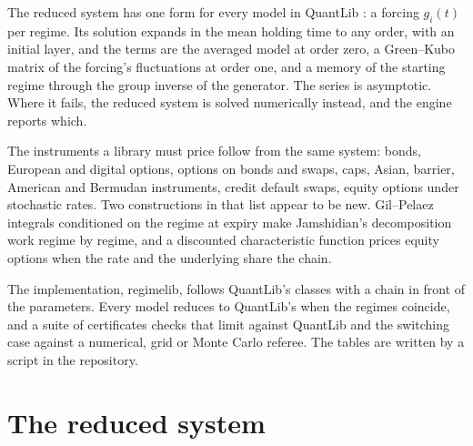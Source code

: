 \documentclass[11pt]{article}
\theoremstyle{remark}
\newcommand{\rl}{\textsf{regimelib}}
\newcommand{\ql}{\textsf{QuantLib}}
\begin{document}
The reduced system has one form for every model in \ql{} \citep{quantlib}: a forcing $g_i(t)$ per regime. Its
solution expands in the mean holding time to any order, with an initial layer, and the terms are the averaged
model at order zero, a Green--Kubo matrix of the forcing's fluctuations at order one, and a memory of the starting
regime through the group inverse of the generator. The series is asymptotic. Where it fails, the reduced system
is solved numerically instead, and the engine reports which.

The instruments a library must price follow from the same system: bonds, European and digital options, options
on bonds and swaps, caps, Asian, barrier, American and Bermudan instruments, credit default swaps, equity options
under stochastic rates. Two constructions in that list appear to be new. Gil--Pelaez integrals conditioned on
the regime at expiry make Jamshidian's decomposition \citep{jamshidian1989} work regime by regime, and a discounted
characteristic function prices equity options when the rate and the underlying share the chain.

The implementation, \rl{}, follows \ql{}'s classes with a chain in front of the parameters. Every model reduces
to \ql{}'s when the regimes coincide, and a suite of certificates checks that limit against \ql{} and the
switching case against a numerical, grid or Monte Carlo referee. The tables are written by a script in the
repository.

\section{The reduced system}
\label{sec:reduced}
\end{document}
